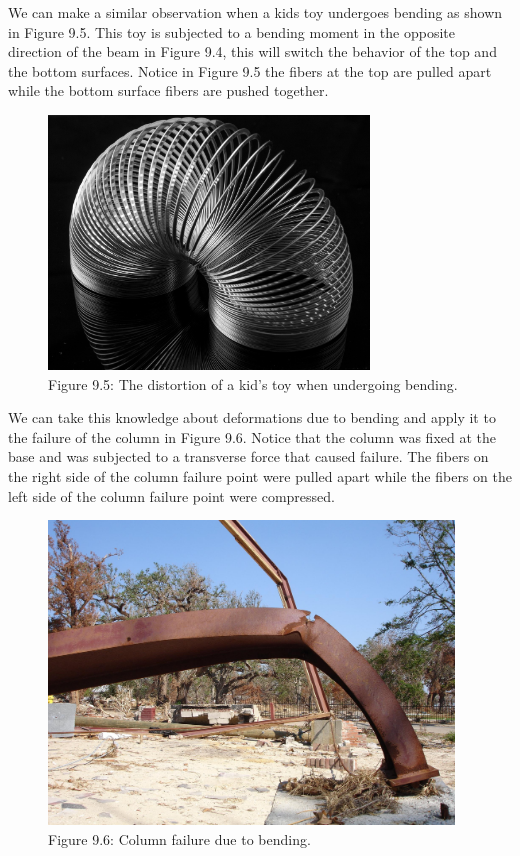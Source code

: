 \documentclass[
  letterpaper,
  DIV=11,
  numbers=noendperiod]{scrreprt}
\begin{document}
We can make a similar observation when a kids toy undergoes bending as
shown in Figure 9.5. This toy is subjected to a bending moment in the
opposite direction of the beam in Figure 9.4, this will switch the
behavior of the top and the bottom surfaces. Notice in Figure 9.5 the
fibers at the top are pulled apart while the bottom surface fibers are
pushed together.

\begin{figure}[H]

{\centering \includegraphics[width=3.35417in,height=\textheight]{images/CH9 PNGs/Figure 9.5.jpg}

}

\caption{Figure 9.5: The distortion of a kid's toy when undergoing
bending.}

\end{figure}%

We can take this knowledge about deformations due to bending and apply
it to the failure of the column in Figure 9.6. Notice that the column
was fixed at the base and was subjected to a transverse force that
caused failure. The fibers on the right side of the column failure point
were pulled apart while the fibers on the left side of the column
failure point were compressed.

\begin{figure}[H]

{\centering \includegraphics[width=4.23958in,height=\textheight]{images/CH9 PNGs/Figure 9.6.jpg}

}

\caption{Figure 9.6: Column failure due to bending.}

\end{figure}%
\end{document}
